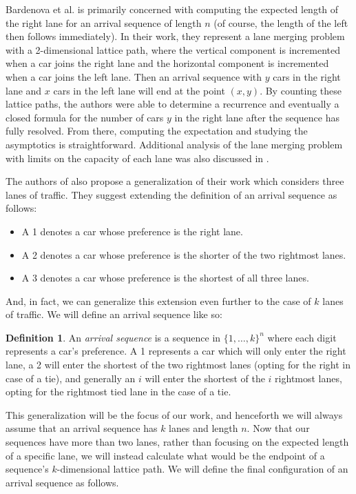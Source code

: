 \documentclass[article]{amsart}
\theoremstyle{plain}
\theoremstyle{definition}
\newtheorem{definition}{Definition}
\begin{document}
Bardenova et al. \cite{bard} is primarily concerned with computing the expected length of the right lane for an arrival sequence of length $n$ (of course, the length of the left then follows immediately). In their work, they represent a lane merging problem with a 2-dimensional lattice path, where the vertical component is incremented when a car joins the right lane and the horizontal component is incremented when a car joins the left lane. Then an arrival sequence with $y$ cars in the right lane and $x$ cars in the left lane will end at the point $(x,y)$. By counting these lattice paths, the authors were able to determine a recurrence and eventually a closed formula for the number of cars $y$ in the right lane after the sequence has fully resolved. From there, computing the expectation and studying the asymptotics is straightforward. Additional analysis of the lane merging problem with limits on the capacity of each lane was also discussed in \cite{insko}. 

The authors of \cite{bard} also propose a generalization of their work which considers three lanes of traffic. They suggest extending the definition of an arrival sequence as follows:

\begin{itemize}
    \item A 1 denotes a car whose preference is the right lane. 
    \item A 2 denotes a car whose preference is the shorter of the two rightmost lanes.
    \item A 3 denotes a car whose preference is the shortest of all three lanes.
\end{itemize}

And, in fact, we can generalize this extension even further to the case of $k$ lanes of traffic. We will define an arrival sequence like so:

\begin{definition} \label{def:gen_arr_seq}
    An \textit{arrival sequence} is a sequence in $\{1,\dots, k\}^n$ where each digit represents a car's preference. A 1 represents a car which will only enter the right lane, a 2 will enter the shortest of the two rightmost lanes (opting for the right in case of a tie), and generally an $i$ will enter the shortest of the $i$ rightmost lanes, opting for the rightmost tied lane in the case of a tie.
\end{definition}

This generalization will be the focus of our work, and henceforth we will always assume that an arrival sequence has $k$ lanes and length $n$. Now that our sequences have more than two lanes, rather than focusing on the expected length of a specific lane, we will instead calculate what would be the endpoint of a sequence's $k$-dimensional lattice path. We will define the final configuration of an arrival sequence as follows.
\end{document}
